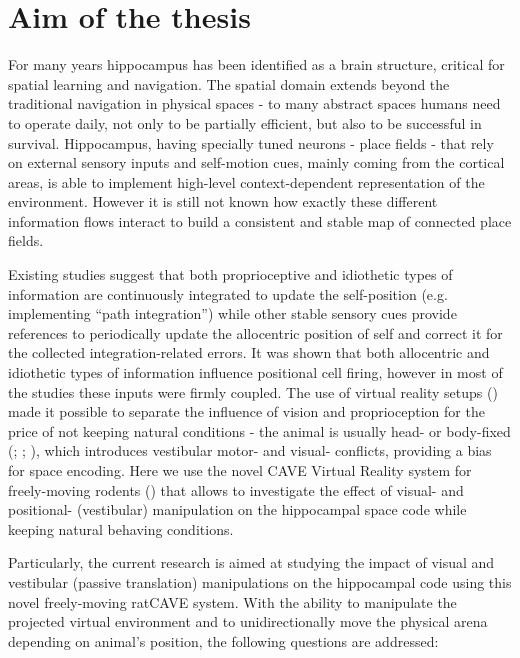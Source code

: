\section{Aim of the thesis}
\label{sec:aim_of_thesis}

For many years hippocampus has been identified as a brain structure, critical for spatial learning and navigation. The spatial domain extends beyond the traditional navigation in physical spaces - to many abstract spaces humans need to operate daily, not only to be partially efficient, but also to be successful in survival. Hippocampus, having specially tuned neurons - place fields - that rely on external sensory inputs and self-motion cues, mainly coming from the cortical areas, is able to implement high-level context-dependent representation of the environment. However it is still not known how exactly these different information flows interact to build a consistent and stable map of connected place fields.

Existing studies suggest that both proprioceptive and idiothetic types of information are continuously integrated to update the self-position (e.g. implementing “path integration”) while other stable sensory cues provide references to periodically update the allocentric position of self and correct it for the collected integration-related errors. It was shown that both allocentric and idiothetic types of information influence positional cell firing, however in most of the studies these inputs were firmly coupled. The use of virtual reality setups (\cite{Thurley2016}) made it possible to separate the influence of vision and proprioception for the price of not keeping natural conditions - the animal is usually head- or body-fixed (\cite{Holscher2005}; \cite{RavassardA.2013}; \cite{Jayakumar2018}), which introduces vestibular motor- and visual- conflicts, providing a bias for space encoding. Here we use the novel CAVE Virtual Reality system for freely-moving rodents (\cite{DelGrosso2018}) that allows to investigate the effect of visual- and positional- (vestibular) manipulation on the hippocampal space code while keeping natural behaving conditions.

Particularly, the current research is aimed at studying the impact of visual and vestibular (passive translation) manipulations on the hippocampal code using this novel freely-moving ratCAVE system. With the ability to manipulate the projected virtual environment and to unidirectionally move the physical arena depending on animal’s position, the following questions are addressed:

